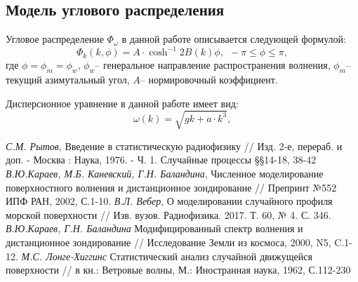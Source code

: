\subsection{Модель углового распределения}
Угловое распределение $\Phi_{\omega}$ в данной работе описывается следующей формулой:
\begin{equation}
	\Phi_{k} (k, \phi)= A\cdot \cosh^{-1}{2B(k) \phi}, ~~ -\pi\leq \phi \leq \pi,
\end{equation}
где $\phi=\phi_m = \phi_w$, $\phi_w$-- генеральное направление распространения волнения,
$\phi_m$-- текущий азимутальный угол, $A$-- нормировочный коэффициент.




Дисперсионное уравнение в данной работе имеет вид:
\begin{equation}
	\label{eq:w_k}
	\omega(k)=\sqrt{gk+a\cdot k^3},
\end{equation}

\newpage
\begin{thebibliography}{}
	 \textit{С.М. Рытов}, Введение в статистическую радиофизику // Изд. 2-е, перераб. и доп. - Москва : Наука, 1976. - Ч. 1. Случайные процессы \S\S 14-18, 38-42 
	 \textit{В.Ю.Караев, М.Б. Каневский, Г.Н. Баландина}, Численное моделирование поверхностного волнения и дистанционное зондирование // Препринт №552 ИПФ РАН, 2002, С.1-10.
	 \textit{В.Л. Вебер}, О моделировании случайного профиля морской поверхности // Изв. вузов. Радиофизика. 2017. Т. 60, № 4. С. 346.
	 \textit{В.Ю.Караев, Г.Н. Баландина} Модифицированный спектр волнения и дистанционное зондирование // Исследование Земли из космоса, 2000, N5, C.1-12.
	 \textit{М.С. Лонге-Хиггинс} Статистический анализ случайной движущейся поверхности // в кн.: Ветровые волны, М.: Иностранная наука, 1962, С.112-230
\end{thebibliography}



